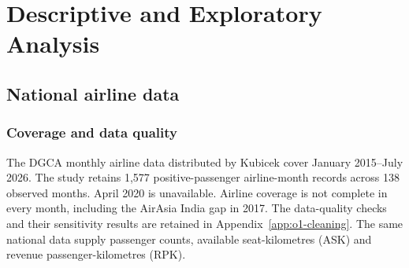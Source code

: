 \section{Descriptive and Exploratory Analysis}
\label{sec:review-eda}
\subsection{National airline data}
\label{sec:o4-national-data}
\subsubsection{Coverage and data quality}
The DGCA monthly airline data distributed by Kubicek cover January 2015--July 2026. The study retains 1,577 positive-passenger airline-month records across 138 observed months. April 2020 is unavailable. Airline coverage is not complete in every month, including the AirAsia India gap in 2017. The data-quality checks and their sensitivity results are retained in Appendix~\ref{app:o1-cleaning}. The same national data supply passenger counts, available seat-kilometres (ASK) and revenue passenger-kilometres (RPK).

